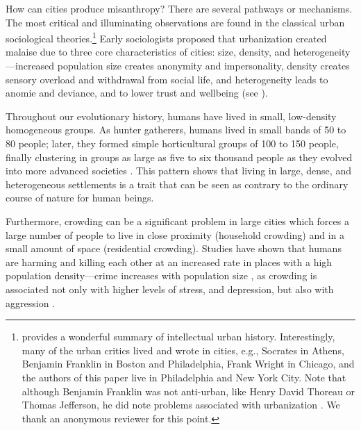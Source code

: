 \documentclass[11pt, letterpaper]{article}
\begin{document}
\begin{spacing}{1.4}
How can cities produce misanthropy? There are several pathways or
mechanisms. The most critical and illuminating observations are found in the
classical urban sociological theories.\footnote{\citet{white77} provides a
  wonderful summary of intellectual urban history. Interestingly, many of the urban critics lived and wrote in cities, e.g., Socrates in Athens, Benjamin Franklin in Boston and Philadelphia, Frank Wright in Chicago, and the authors of this paper live in Philadelphia and New York City. Note that although Benjamin Franklin was not anti-urban, like Henry David Thoreau or Thomas Jefferson, he did note problems associated with urbanization \citep[e.g., p. 32]{white77}. We thank an anonymous reviewer for this point.} 
 Early sociologists proposed that urbanization created malaise due to three core characteristics of cities: size, density, and heterogeneity---increased population size creates anonymity and
 impersonality, density creates sensory overload and withdrawal from social
 life, and heterogeneity leads to anomie and deviance, and to lower trust and wellbeing (see \citet{park84,
   simmel03, tonnies57, wirth38,putnam07,aok_brfss_segregation15,herbst14,postmes02,vogt07,smelser99}).
%

Throughout our evolutionary history, humans have lived in small, low-density homogeneous groups. As hunter gatherers, humans lived in small bands of 50 to 80 people; later, they formed simple horticultural groups of 100 to 150 people, finally clustering in groups as large as five to six thousand people as they evolved into more advanced societies \citep{maryanski92}. This pattern shows that living in large, dense, and heterogeneous settlements is a trait that can be seen as contrary to the ordinary course of nature for human beings. 

Furthermore, crowding can be a significant problem in large cities which forces a large number of people to live in close proximity (household crowding) and in a small amount of space (residential crowding). Studies have shown that humans are harming and killing each other at an increased rate in places with a high population density---crime increases with population size \citep{bettencourt10b}, as crowding is associated not only with higher levels of stress, and depression, but also with aggression \citep{regoeczi2008,calhoun62}. 


\end{spacing}
\end{document}
